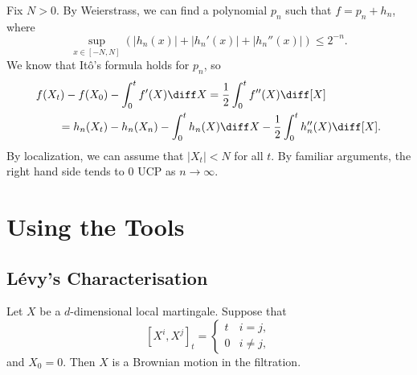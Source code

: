 \documentclass[12pt]{article}
\begin{document}
\begin{proofbox}
	Fix $N > 0$. By Weierstrass, we can find a polynomial $p_n$ such that $f = p_n + h_n$, where
	\[
		\sup_{x \in [-N, N]} (|h_n(x)| + |h_n'(x)| + |h_n''(x)|) \leq 2^{-n}.
	\]
	We know that It\^o's formula holds for $p_n$, so
	\begin{align*}
		&f(X_t) - f(X_0) - \int_0^{t} f'(X) \diff X = \frac 12 \int_0^{t} f''(X) \diff [X] \\
		& \qquad= h_n(X_t) - h_n(X_n) - \int_0^{t} h_n(X) \diff X - \frac 12 \int_0^{t} h_n''(X) \diff [X].
	\end{align*}
	By localization, we can assume that $|X_t| < N$ for all $t$. By familiar arguments, the right hand side tends to 0 UCP as $n \to \infty$.
\end{proofbox}


\newpage

\section{Using the Tools}%
\label{sec:ut}

\subsection{L\'evy's Characterisation}%
\label{sub:lc}

\begin{theorem}
	Let $X$ be a $d$-dimensional local martingale. Suppose that
	\[
		[X^{i}, X^{j}]_t =
		\begin{cases}
			t & i = j, \\
			0 & i \neq j,
		\end{cases}
	\]
	and $X_0 = 0$. Then $X$ is a Brownian motion in the filtration.
\end{theorem}
\end{document}
